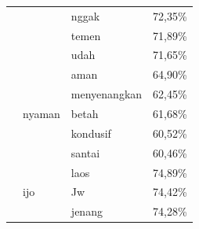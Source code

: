 \begin{longtable}[c]{|l|l|l|l|}
                                                                                                                           &                              & nggak                    & 72,35\%           \\ \cline{3-4}
                                                                                                                           &                              & temen                    & 71,89\%           \\ \cline{3-4}
                                                                                                                           &                              & udah                     & 71,65\%           \\ \cline{2-4}
                                                                                                                           & \multirow[t]{5}{*}{nyaman}   & aman                     & 64,90\%           \\ \cline{3-4}
                                                                                                                           &                              & menyenangkan             & 62,45\%           \\ \cline{3-4}
                                                                                                                           &                              & betah                    & 61,68\%           \\ \cline{3-4}
                                                                                                                           &                              & kondusif                 & 60,52\%           \\ \cline{3-4}
                                                                                                                           &                              & santai                   & 60,46\%           \\ \cline{2-4}
                                                                                                                           & \multirow[t]{5}{*}{ijo}      & laos                     & 74,89\%           \\ \cline{3-4}
                                                                                                                           &                              & Jw                       & 74,42\%           \\ \cline{3-4}
                                                                                                                           &                              & jenang                   & 74,28\%           \\ \cline{3-4}

\end{longtable}
